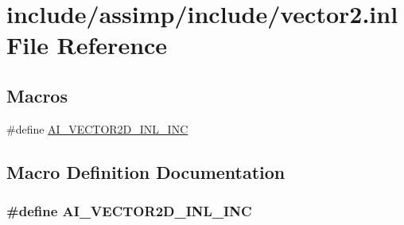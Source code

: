 \hypertarget{vector2_8inl}{\section{include/assimp/include/vector2.inl File Reference}
\label{vector2_8inl}
}
\subsection*{Macros}
\begin{DoxyCompactItemize}
\item 
\#define \hyperlink{vector2_8inl_a272314dd4c566e8a862e448ac0fe5887}{A\-I\-\_\-\-V\-E\-C\-T\-O\-R2\-D\-\_\-\-I\-N\-L\-\_\-\-I\-N\-C}
\end{DoxyCompactItemize}


\subsection{Macro Definition Documentation}
\hypertarget{vector2_8inl_a272314dd4c566e8a862e448ac0fe5887}{
\subsubsection[{A\-I\-\_\-\-V\-E\-C\-T\-O\-R2\-D\-\_\-\-I\-N\-L\-\_\-\-I\-N\-C}]{\setlength{\rightskip}{0pt plus 5cm}\#define A\-I\-\_\-\-V\-E\-C\-T\-O\-R2\-D\-\_\-\-I\-N\-L\-\_\-\-I\-N\-C}}\label{vector2_8inl_a272314dd4c566e8a862e448ac0fe5887}
